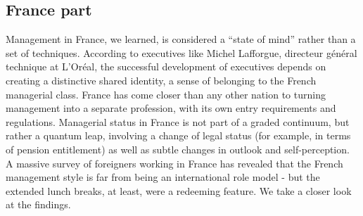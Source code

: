 \documentclass[a4paper,12pt]{report} %
\begin{document}
\subsection{France part}
Management in France, we learned, is considered a “state of mind” rather than a set of techniques. According to executives like Michel Lafforgue, directeur général technique at L’Oréal, the successful development of executives depends on creating a distinctive shared identity, a sense of belonging to the French managerial class.
France has come closer than any other nation to turning management into a separate profession, with its own entry requirements and regulations. Managerial status in France is not part of a graded continuum, but rather a quantum leap, involving a change of legal status (for example, in terms of pension entitlement) as well as subtle changes in outlook and self-perception.
A massive survey of foreigners working in France has revealed that the French management style is far from being an international role model - but the extended lunch breaks, at least, were a redeeming feature. We take a closer look at the findings.




\end{document}
